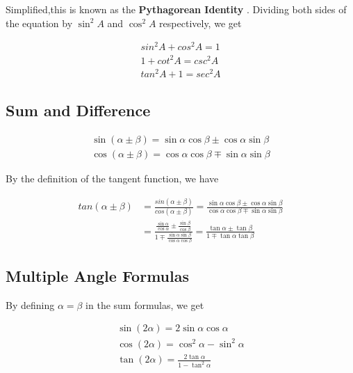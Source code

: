 \documentclass{article}
\begin{document}
            \noindent Simplified,this is known as the \color{purple} \textbf{Pythagorean Identity}
            \color{black}. Dividing both sides of the equation by $\sin ^2 A$ and $\cos ^2 A$
            respectively, we get

            \begin{align*}
                sin^2 A + cos^2 A = 1 \\
                1 + cot^2 A = csc^2 A \\
                tan^2 A + 1 = sec^2 A
            \end{align*}


        \subsection{Sum and Difference}
            \begin{align*}
                \sin (\alpha \pm \beta) = \sin \alpha \cos \beta \pm \cos \alpha \sin \beta \\
                \cos (\alpha \pm \beta) = \cos \alpha \cos \beta \mp \sin \alpha \sin \beta
            \end{align*}

            \noindent By the definition of the tangent function, we have

            \begin{align*}
                tan(\alpha \pm \beta) &= \frac{sin(\alpha \pm \beta)}{cos(\alpha \pm \beta)}
                = \frac{\sin \alpha \cos \beta \pm \cos \alpha \sin \beta}{\cos \alpha \cos \beta \mp \sin \alpha \sin \beta} \\
                &= \frac{\frac{\sin\alpha}{\cos\alpha}\pm\frac{\sin\beta}{\cos\beta}}{1\mp\frac{\sin\alpha\sin\beta}{\cos\alpha\cos\beta}}
                = \frac{\tan\alpha \pm \tan\beta}{1 \mp \tan\alpha\tan\beta}
            \end{align*}

        \subsection{Multiple Angle Formulas}

            By defining $\alpha = \beta$ in the sum formulas, we get

            \begin{align*}
                \sin (2\alpha) = 2 \sin\alpha \cos\alpha \\
                \cos (2\alpha) = \cos ^2 \alpha - \sin ^2 \alpha \\
                \tan (2\alpha) = \frac{2\tan\alpha}{1-\tan ^2\alpha}
            \end{align*}
\end{document}
